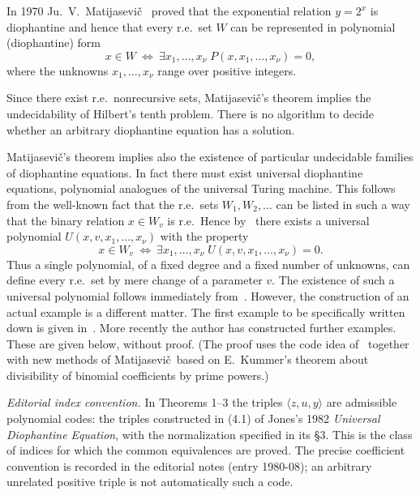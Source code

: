 \documentclass[11pt,letterpaper]{article}
\newcommand{\origpage}[1]{\marginnote{\footnotesize\textbf{[#1]}}}
\newcommand{\Matijasevic}{Matijasevi\v{c}}
\begin{document}
In 1970 Ju.~V.~\Matijasevic~\cite{Mat70} proved that the exponential
relation $y=2^x$ is diophantine and hence that every r.e.\ set $W$ can be
represented in polynomial (diophantine) form
\[
 x\in W\ \Longleftrightarrow\
 \exists x_1,\ldots,x_\nu\;
 P(x,x_1,\ldots,x_\nu)=0,
\]
where the unknowns $x_1,\ldots,x_\nu$ range over positive integers.

Since there exist r.e.\ nonrecursive sets, \Matijasevic's theorem implies
the undecidability of Hilbert's tenth problem. There is no algorithm to
decide whether an arbitrary diophantine equation has a solution.

\Matijasevic's theorem implies also the existence of particular undecidable
families of diophantine equations. In fact there must exist universal
diophantine equations, polynomial analogues of the universal Turing
machine. This follows from the well-known fact that the r.e.\ sets
$W_1,W_2,\ldots$ can be listed in such a way that the binary relation
$x\in W_v$ is r.e.\ Hence by~\cite{DPR,Mat70} there exists a universal
polynomial $U(x,v,x_1,\ldots,x_\nu)$ with the property
\[
 x\in W_v\ \Longleftrightarrow\
 \exists x_1,\ldots,x_\nu\;
 U(x,v,x_1,\ldots,x_\nu)=0.
\]
Thus a single polynomial, of a fixed degree and a fixed number of
unknowns, can define every r.e.\ set by mere change of a parameter $v$.
The existence of such\origpage{860} a universal polynomial follows immediately
from~\cite{DPR,Mat70}. However, the construction of an actual example is
a different matter. The first example to be specifically written down
is given in~\cite{Jones78}. More recently the author has constructed
further examples. These are given below, without proof. (The proof uses
the code idea of~\cite{MR75} together with new methods of \Matijasevic\
based on E.~Kummer's theorem about divisibility of binomial coefficients
by prime powers.)

\newpage
\noindent\textit{Editorial index convention.} In Theorems 1--3 the triples
$\langle z,u,y\rangle$ are admissible polynomial codes: the triples constructed
in (4.1) of Jones's 1982 \textit{Universal Diophantine Equation}, with the
normalization specified in its \S3. This is the class of indices for which
the common equivalences are proved. The precise coefficient convention is
recorded in the editorial notes (entry 1980-08); an arbitrary unrelated
positive triple is not automatically such a code.
\end{document}
